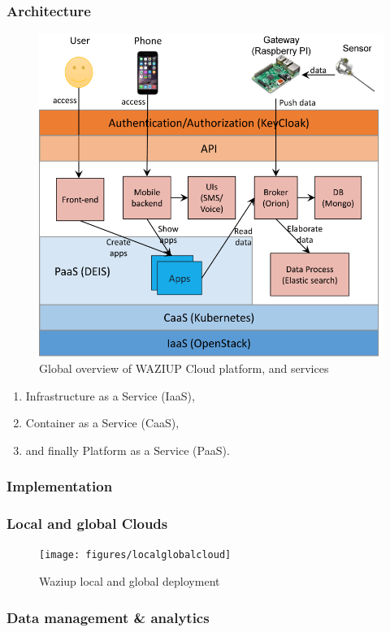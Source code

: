 \documentclass{beamer}
\begin{document}
\begin{frame}
\frametitle{Architecture}

  \begin{figure}[H] 
  \centering  
  \includegraphics[width=.7\linewidth]{figures/CloudServicesArchitecture.png}   
  \caption{Global overview of WAZIUP Cloud platform, and services}
  \label{fig-implem}  
  \end{figure}

  \begin{enumerate}
    \item Infrastructure as a Service (IaaS),    
    \item Container as a Service (CaaS),    
    \item and finally Platform as a Service (PaaS).
  \end{enumerate}

\end{frame}


\begin{frame}
\frametitle{Implementation}
 
\end{frame}



\begin{frame}
\frametitle{Local and global Clouds}

  \begin{figure}[H] 
  \centering  
  \texttt{[image: figures/localglobalcloud]}   
  \caption{Waziup local and global deployment}
  \label{fig-localglobalcloud}  
  \end{figure}
    
\end{frame}

\begin{frame}
\frametitle{Data management \& analytics}

    
\end{frame}
\end{document}
